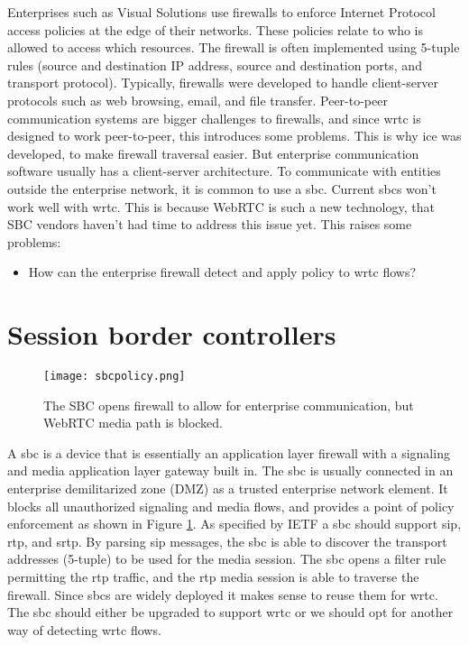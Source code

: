 Enterprises such as Visual Solutions use firewalls to enforce Internet Protocol access policies at the edge of their networks. These policies relate to who is allowed to access which resources. The firewall is often implemented using 5-tuple rules (source and destination IP address, source and destination ports, and transport protocol). Typically, firewalls were developed to handle client-server protocols such as web browsing, email, and file transfer\cite{johnston_taking_2013}. Peer-to-peer communication systems are bigger challenges to firewalls, and since \gls{wrtc} is designed to work peer-to-peer, this introduces some problems. This is why \gls{ice} was developed, to make firewall traversal easier. But enterprise communication software usually has a client-server architecture. To communicate with entities outside the enterprise network, it is common to use a \gls{sbc}. Current \gls{sbc}s won't work well with \gls{wrtc}. This is because WebRTC is such a new technology, that SBC vendors haven't had time to address this issue yet. This raises some problems:

\begin{itemize}
\item{How can the enterprise firewall detect and apply policy to \gls{wrtc} flows?}
\end{itemize}

\section{Session border controllers}

\begin{figure}[here]
\centerline{\texttt{[image: sbcpolicy.png]}}
\caption{The SBC opens firewall to allow for enterprise communication, but WebRTC media path is blocked.}
\label{fig:sbc-policy}
\end{figure}

A \gls{sbc} is a device that is essentially an application layer firewall with a signaling and media application layer gateway built in. The \gls{sbc} is usually connected in an enterprise demilitarized zone (DMZ) as a trusted enterprise network element. It blocks all unauthorized signaling and media flows, and provides a point of policy enforcement as shown in Figure \ref{fig:sbc-policy}. As specified by IETF\cite{sbc} a \gls{sbc} should support \gls{sip}, \gls{rtp}, and \gls{srtp}. By parsing \gls{sip} messages, the \gls{sbc} is able to discover the transport addresses (5-tuple) to be used for the media session. The \gls{sbc} opens a filter rule permitting the \gls{rtp} traffic, and the \gls{rtp} media session is able to traverse the firewall. Since \gls{sbc}s are widely deployed it makes sense to reuse them for \gls{wrtc}. The \gls{sbc} should either be upgraded to support \gls{wrtc} or we should opt for another way of detecting \gls{wrtc} flows.

